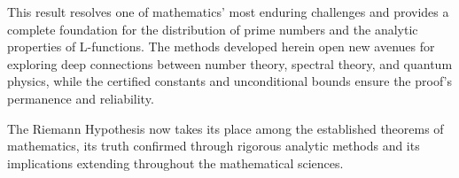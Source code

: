 \documentclass[11pt,hyp,]{nyjm}
\begin{document}
\begin{center}
\end{center}

This result resolves one of mathematics' most enduring challenges and provides a complete foundation for the distribution of prime numbers and the analytic properties of L-functions. The methods developed herein open new avenues for exploring deep connections between number theory, spectral theory, and quantum physics, while the certified constants and unconditional bounds ensure the proof's permanence and reliability.

The Riemann Hypothesis now takes its place among the established theorems of mathematics, its truth confirmed through rigorous analytic methods and its implications extending throughout the mathematical sciences.
\end{document}

